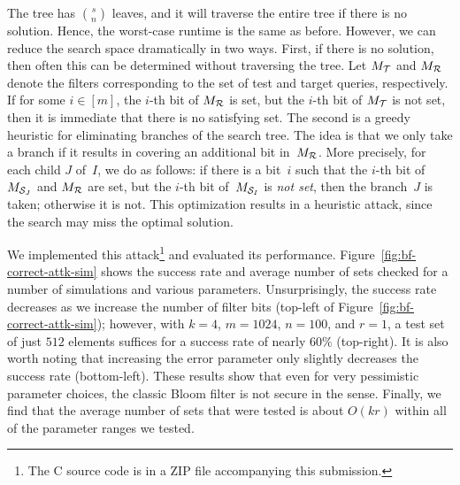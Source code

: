 The tree has $\binom{s}{n}$ leaves, and it will traverse the entire tree if
there is no solution. Hence, the worst-case runtime is the same as before.
However, we can reduce the search space dramatically in two ways.
%
First, if there is no solution, then often this can be determined without
traversing the tree. Let $M_{\mathcal{T}}$ and $M_{\mathcal{R}}$ denote the filters
corresponding to the set of test and target queries, respectively.  If for some
$i \in [m]$, the $i$-th bit of $M_{\mathcal{R}}$ is set, but the $i$-th bit of $M_{\mathcal{T}}$
is not set, then it is immediate that there is no satisfying set.
%
The second is a greedy heuristic for eliminating branches of the search tree.
The idea is that we only take a branch if it results in covering an additional
bit in~$M_{\mathcal{R}}$. More precisely, for each child $J$ of~$I$, we do as follows:
if there is a bit~$i$ such that the $i$-th bit of $M_{\mathcal{S}_J}$ and $M_{\mathcal{R}}$
are set, but the $i$-th bit of~$M_{\mathcal{S}_I}$ is \emph{not set}, then the
branch~$J$ is taken; otherwise it is not.
%
This optimization results in a heuristic attack, since the search may miss the
optimal solution.

We implemented this attack\footnote{The C source code is in a ZIP file
accompanying this submission.} and evaluated its performance.
Figure~\ref{fig:bf-correct-attk-sim} shows the success rate and average number
of sets checked for a number of simulations and various parameters.
%
Unsurprisingly, the success rate decreases as we increase the number of filter
bits (top-left of Figure~\ref{fig:bf-correct-attk-sim}); however, with $k=4$,
$m=1024$, $n=100$, and $r=1$, a test set of just $512$ elements suffices for a
success rate of nearly $60\%$ (top-right). It is also worth noting that
increasing the error parameter only slightly decreases the success rate
(bottom-left). These results show that even for very pessimistic parameter
choices, the classic Bloom filter is not secure in the \errep sense.
%
Finally, we find that the average number of sets that were tested is about
$O(kr)$ within all of the parameter ranges we tested.

